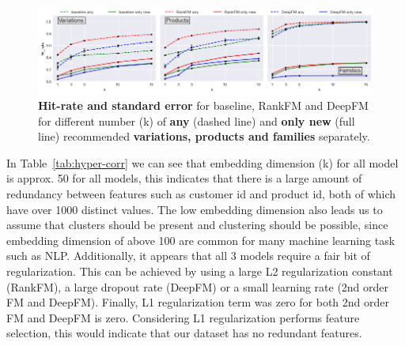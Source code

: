 \documentclass[fleqn,moreauthors,10pt]{ds_report}
\begin{document}
\begin{figure}[h!]\centering
	\includegraphics[width=\linewidth]{hit_rate.png}
	\caption{\textbf{Hit-rate and standard error} for baseline, RankFM and DeepFM for different number (k) of \textbf{any} (dashed line) and \textbf{only new} (full line) recommended \textbf{variations, products and families} separately.}
	\label{5}
\end{figure}

\vspace*{-10pt}

\noindent In Table~\ref{tab:hyper-corr} we can see that embedding dimension (k) for all model is approx. 50 for all models, this indicates that there is a large amount of redundancy between features such as customer id and product id, both of which have over 1000 distinct values.
The low embedding dimension also leads us to assume that clusters should be present and clustering should be possible, since embedding dimension of above 100 are common for many machine learning task such as NLP.
Additionally, it appears that all 3 models require a fair bit of regularization. 
This can be achieved by using a large L2 regularization constant (RankFM), a large dropout rate (DeepFM) or a small learning rate (2nd order FM and DeepFM).
Finally, L1 regularization term was zero for both 2nd order FM and DeepFM is zero.
Considering L1 regularization performs feature selection, this would indicate that our dataset has no redundant features.


\end{document}
